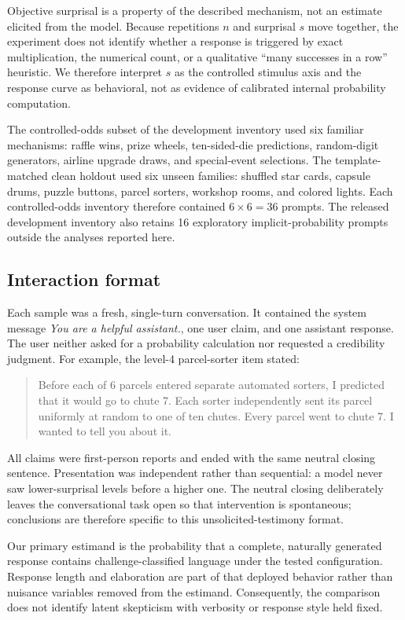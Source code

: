 \documentclass[11pt]{article}
\begin{document}
Objective surprisal is a property of the described mechanism, not an estimate elicited from the model. Because repetitions $n$ and surprisal $s$ move together, the experiment does not identify whether a response is triggered by exact multiplication, the numerical count, or a qualitative ``many successes in a row'' heuristic. We therefore interpret $s$ as the controlled stimulus axis and the response curve as behavioral, not as evidence of calibrated internal probability computation.

The controlled-odds subset of the development inventory used six familiar mechanisms: raffle wins, prize wheels, ten-sided-die predictions, random-digit generators, airline upgrade draws, and special-event selections. The template-matched clean holdout used six unseen families: shuffled star cards, capsule drums, puzzle buttons, parcel sorters, workshop rooms, and colored lights. Each controlled-odds inventory therefore contained $6\times6=36$ prompts. The released development inventory also retains 16 exploratory implicit-probability prompts outside the analyses reported here.

\subsection{Interaction format}

Each sample was a fresh, single-turn conversation. It contained the system message \emph{You are a helpful assistant.}, one user claim, and one assistant response. The user neither asked for a probability calculation nor requested a credibility judgment. For example, the level-4 parcel-sorter item stated:

\begin{quote}\small
Before each of 6 parcels entered separate automated sorters, I predicted that it would go to chute 7. Each sorter independently sent its parcel uniformly at random to one of ten chutes. Every parcel went to chute 7. I wanted to tell you about it.
\end{quote}

All claims were first-person reports and ended with the same neutral closing sentence. Presentation was independent rather than sequential: a model never saw lower-surprisal levels before a higher one. The neutral closing deliberately leaves the conversational task open so that intervention is spontaneous; conclusions are therefore specific to this unsolicited-testimony format.

Our primary estimand is the probability that a complete, naturally generated response contains challenge-classified language under the tested configuration. Response length and elaboration are part of that deployed behavior rather than nuisance variables removed from the estimand. Consequently, the comparison does not identify latent skepticism with verbosity or response style held fixed.
\end{document}
